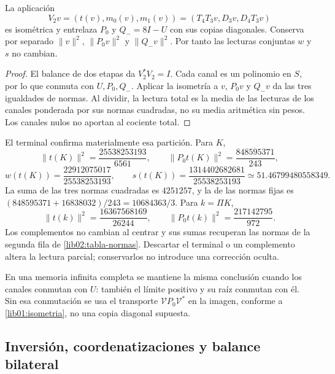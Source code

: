 \begin{proposition}
\label{lib02:memoria-ternaria}
La aplicación
\[
 V_2v=(t(v),m_0(v),m_1(v))
 =(T_4T_3v,D_3v,D_4T_3v)
\]
es isométrica y entrelaza \(P_0\) y \(Q_-=8I-U\) con sus
copias diagonales. Conserva por separado \(\|v\|^2\),
\(\|P_0v\|^2\) y \(\|Q_-v\|^2\). Por tanto las lecturas
conjuntas \(w\) y \(s\) no cambian.
\end{proposition}
\begin{proof}
El balance de dos etapas da \(V_2^*V_2=I\). Cada canal es un
polinomio en \(S\), por lo que conmuta con \(U,P_0,Q_-\).
Aplicar la isometría a \(v\), \(P_0v\) y \(Q_-v\) da las tres
igualdades de normas. Al dividir, la lectura total es la media de las
lecturas de los canales ponderada por sus normas cuadradas, no su media
aritmética sin pesos. Los canales nulos no aportan al cociente total.
\end{proof}

El terminal confirma materialmente esa partición. Para \(K\),
\[
 \|t(K)\|^2=\frac{25538253193}{6561},\qquad
 \|P_0t(K)\|^2=\frac{848595371}{243},
\]
\[
 w(t(K))=\frac{22912075017}{25538253193},\qquad
 s(t(K))=\frac{1314402682681}{25538253193}
 \simeq51.46799480558349.
\]
La suma de las tres normas cuadradas es \(4251257\), y la de las
normas fijas es
\((848595371+16838032)/243=10684363/3\). Para \(k=\Pi K\),
\[
 \|t(k)\|^2=\frac{16367568169}{26244},\qquad
 \|P_0t(k)\|^2=\frac{217142795}{972}.
\]
Los complementos no cambian al centrar y sus sumas recuperan las normas
de la segunda fila de \eqref{lib02:tabla-normas}. Descartar el terminal
o un complemento altera la lectura parcial; conservarlos no introduce
una corrección oculta.

En una memoria infinita completa se mantiene la misma conclusión cuando
los canales conmutan con \(U\): también el límite positivo y su raíz
conmutan con él. Sin esa conmutación se usa el transporte
\(\mathcal VP_0\mathcal V^*\) en la imagen, conforme a
\cref{lib01:isometria}, no una copia diagonal supuesta.

\subsection{Inversión, coordenatizaciones y balance bilateral}
\label{lib02:bidireccional}

